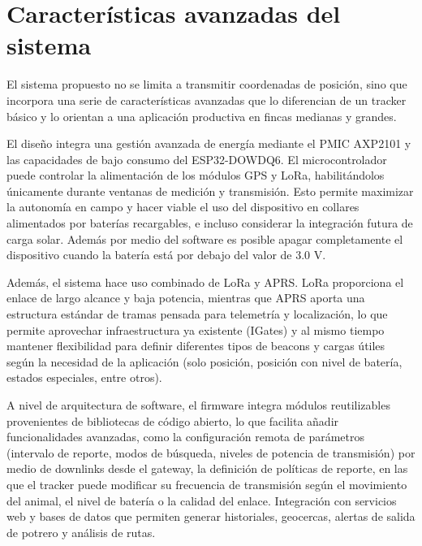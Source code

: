 \documentclass[journal]{IEEEtran}
\begin{document}
\section{Características avanzadas del sistema}

El sistema propuesto no se limita a transmitir coordenadas de posición, sino que incorpora una serie de características avanzadas que lo diferencian de un tracker básico y lo orientan a una aplicación productiva en fincas medianas y grandes.

El diseño integra una gestión avanzada de energía mediante el PMIC AXP2101 y las capacidades de bajo consumo del ESP32-DOWDQ6. El microcontrolador puede controlar la alimentación de los módulos GPS y LoRa, habilitándolos únicamente durante ventanas de medición y transmisión. Esto permite maximizar la autonomía en campo y hacer viable el uso del dispositivo en collares alimentados por baterías recargables, e incluso considerar la integración futura de carga solar. Además por medio del software es posible apagar completamente el dispositivo cuando la batería está por debajo del valor de 3.0 V.

Además, el sistema hace uso combinado de LoRa y APRS. LoRa proporciona el enlace de largo alcance y baja potencia, mientras que APRS aporta una estructura estándar de tramas pensada para telemetría y localización, lo que permite aprovechar infraestructura ya existente (IGates) y al mismo tiempo mantener flexibilidad para definir diferentes tipos de beacons y cargas útiles según la necesidad de la aplicación (solo posición, posición con nivel de batería, estados especiales, entre otros).

A nivel de arquitectura de software, el firmware integra módulos reutilizables provenientes de bibliotecas de código abierto, lo que facilita añadir funcionalidades avanzadas, como la configuración remota de parámetros (intervalo de reporte, modos de búsqueda, niveles de potencia de transmisión) por medio de downlinks desde el gateway, la definición de políticas de reporte, en las que el tracker puede modificar su frecuencia de transmisión según el movimiento del animal, el nivel de batería o la calidad del enlace. Integración con servicios web y bases de datos que permiten generar historiales, geocercas, alertas de salida de potrero y análisis de rutas.
\end{document}
